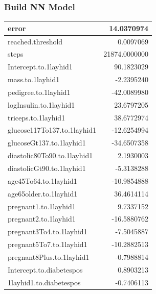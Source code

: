 \documentclass[
]{book}
\newenvironment{Shaded}{\begin{snugshade}}{\end{snugshade}}
\newcommand{\AttributeTok}[1]{\textcolor[rgb]{0.13,0.29,0.53}{#1}}
\newcommand{\CommentTok}[1]{\textcolor[rgb]{0.56,0.35,0.01}{\textit{#1}}}
\newcommand{\DecValTok}[1]{\textcolor[rgb]{0.00,0.00,0.81}{#1}}
\newcommand{\FloatTok}[1]{\textcolor[rgb]{0.00,0.00,0.81}{#1}}
\newcommand{\FunctionTok}[1]{\textcolor[rgb]{0.13,0.29,0.53}{\textbf{#1}}}
\newcommand{\NormalTok}[1]{#1}
\newcommand{\OtherTok}[1]{\textcolor[rgb]{0.56,0.35,0.01}{#1}}
\newcommand{\SpecialCharTok}[1]{\textcolor[rgb]{0.81,0.36,0.00}{\textbf{#1}}}
\newcommand{\StringTok}[1]{\textcolor[rgb]{0.31,0.60,0.02}{#1}}
\begin{document}
\hypertarget{build-nn-model}{%
\subsubsection{Build NN Model}\label{build-nn-model}}

\begin{Shaded}
\end{Shaded}

\begin{tabular}{l|r}
\hline
error & 14.0370974\\
\hline
reached.threshold & 0.0097069\\
\hline
steps & 21874.0000000\\
\hline
Intercept.to.1layhid1 & 90.1823029\\
\hline
mass.to.1layhid1 & -2.2395240\\
\hline
pedigree.to.1layhid1 & -42.0089980\\
\hline
logInsulin.to.1layhid1 & 23.6797205\\
\hline
triceps.to.1layhid1 & 38.6772974\\
\hline
glucose117To137.to.1layhid1 & -12.6254994\\
\hline
glucoseGt137.to.1layhid1 & -34.6507358\\
\hline
diastolic80To90.to.1layhid1 & 2.1930003\\
\hline
diastolicGt90.to.1layhid1 & -5.3138288\\
\hline
age45To64.to.1layhid1 & -10.9854888\\
\hline
age65older.to.1layhid1 & 36.4614114\\
\hline
pregnant1.to.1layhid1 & 9.7337152\\
\hline
pregnant2.to.1layhid1 & -16.5880762\\
\hline
pregnant3To4.to.1layhid1 & -7.5045887\\
\hline
pregnant5To7.to.1layhid1 & -10.2882513\\
\hline
pregnant8Plus.to.1layhid1 & -0.7988814\\
\hline
Intercept.to.diabetespos & 0.8903213\\
\hline
1layhid1.to.diabetespos & -0.7406113\\
\hline
\end{tabular}
\end{document}
